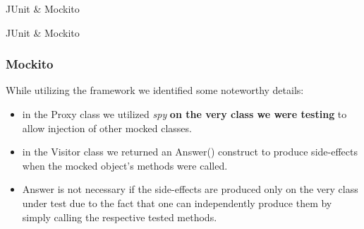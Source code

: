 \documentclass{beamer}
\theoremstyle{definition}
\begin{document}
\begin{section}{JUnit \& Mockito}
\begin{subsection}{JUnit \& Mockito}
\begin{frame}
\begin{itemize}
\begin{itemize}
		\end{itemize}
				\end{itemize}
				\end{frame}
				
				\begin{frame}
					\frametitle{Mockito}
									
						While utilizing the framework we identified some noteworthy details:
						\begin{itemize}
							\item in the Proxy class we utilized \textit{spy} \textbf{on the very class we were testing} to allow injection of other mocked classes.
						
							\item in the Visitor class we returned an Answer() construct to produce side-effects when the mocked object's methods were called. 
							\item Answer is not necessary if the side-effects are produced only on the very class under test due to the fact that one can independently produce them by simply calling the respective tested methods.
						\end{itemize}
					\end{frame}
			\end{subsection}
		\end{section}
		
\end{document}
